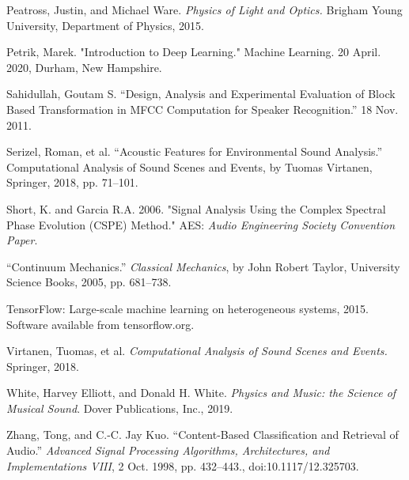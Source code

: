 \documentclass[12pt,letterpaper]{article}
\begin{document}
\begin{thebibliography}{9}
Peatross, Justin, and Michael Ware. \textit{Physics of Light and Optics.} Brigham Young University, Department of Physics, 2015.

Petrik, Marek. "Introduction to Deep Learning." Machine Learning. 20 April. 2020, Durham, New Hampshire.

Sahidullah, Goutam S. “Design, Analysis and Experimental Evaluation of Block Based Transformation in MFCC Computation for Speaker Recognition.” 18 Nov. 2011. 

Serizel, Roman, et al. “Acoustic Features for Environmental Sound Analysis.” Computational Analysis of Sound Scenes and Events, by Tuomas Virtanen, Springer, 2018, pp. 71–101. 

Short, K. and Garcia R.A. 2006. "Signal Analysis Using the Complex Spectral Phase Evolution (CSPE) Method." AES: \textit{Audio Engineering Society Convention Paper}.

“Continuum Mechanics.” \textit{Classical Mechanics}, by John Robert Taylor, University Science Books, 2005, pp. 681–738. 

TensorFlow: Large-scale machine learning on heterogeneous systems,
2015. Software available from tensorflow.org.

Virtanen, Tuomas, et al. \textit{Computational Analysis of Sound Scenes and Events.} Springer, 2018.

White, Harvey Elliott, and Donald H. White. \textit{Physics and Music: the Science of Musical Sound}. Dover Publications, Inc., 2019.

Zhang, Tong, and C.-C. Jay Kuo. “Content-Based Classification and Retrieval of Audio.” \textit{Advanced Signal Processing Algorithms, Architectures, and Implementations VIII}, 2 Oct. 1998, pp. 432–443., doi:10.1117/12.325703.

\end{thebibliography}

\end{document}
